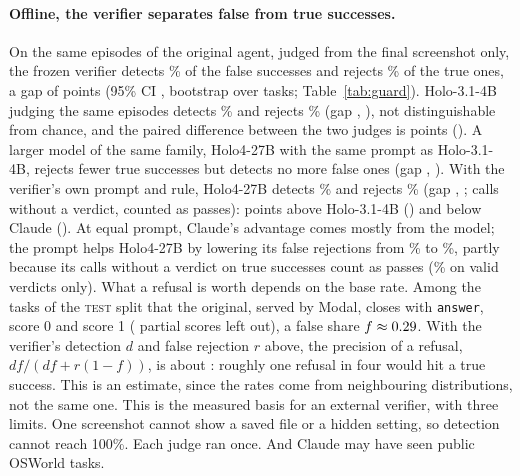 \paragraph{Offline, the verifier separates false from true successes.} On the same \gbEpisodes{} episodes of the original agent, judged from the final screenshot only, the frozen verifier detects \gbClaudeDet\% of the false successes and rejects \gbClaudeRej\% of the true ones, a gap of \gbClaudeGap{} points (95\% CI \gbClaudeGapCi, bootstrap over \gbTasks{} tasks; Table~\ref{tab:guard}). Holo-3.1-4B judging the same episodes detects \gbHoloDet\% and rejects \gbHoloRej\% (gap \gbHoloGap, \gbHoloGapCi), not distinguishable from chance, and the paired difference between the two judges is \gbClaudeVsHolo{} points (\gbClaudeVsHoloCi). A larger model of the same family, Holo4-27B with the same prompt as Holo-3.1-4B, rejects fewer true successes but detects no more false ones (gap \gbHolofourGap, \gbHolofourGapCi). With the verifier's own prompt and rule, Holo4-27B detects \gbHolofourfeciDet\% and rejects \gbHolofourfeciRej\% (gap \gbHolofourfeciGap, \gbHolofourfeciGapCi; \gbHolofourfeciNoVerdict{} calls without a verdict, counted as passes): \gbHolofourfeciVsHolo{} points above Holo-3.1-4B (\gbHolofourfeciVsHoloCi) and \gbHolofourfeciVsClaude{} below Claude (\gbHolofourfeciVsClaudeCi). At equal prompt, Claude's advantage comes mostly from the model; the prompt helps Holo4-27B by lowering its false rejections from \gbHolofourRej\% to \gbHolofourfeciRej\%, partly because its \gbHolofourfeciNoVerdictTrue{} calls without a verdict on true successes count as passes (\gbHolofourfeciRejValid\% on valid verdicts only). What a refusal is worth depends on the base rate. Among the tasks of the \textsc{test} split that the original, served by Modal, closes with \texttt{answer}, \fgBaseFsDone{} score 0 and \fgBaseTrueDone{} score 1 (\fgBasePartialDone{} partial scores left out), a false share $f\approx0.29$. With the verifier's detection $d$ and false rejection $r$ above, the precision of a refusal, $df/(df+r(1-f))$, is about \fgPrecision: roughly one refusal in four would hit a true success. This is an estimate, since the rates come from neighbouring distributions, not the same one. %
This is the measured basis for an external verifier, with three limits. One screenshot cannot show a saved file or a hidden setting, so detection cannot reach 100\%. Each judge ran once. And Claude may have seen public OSWorld tasks. %


